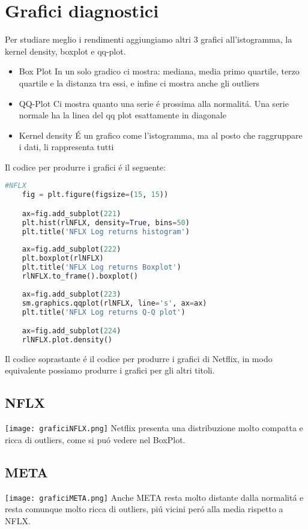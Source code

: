 \documentclass{report}
\begin{document}
\section{Grafici diagnostici}
Per studiare meglio i rendimenti aggiungiamo altri 3 grafici all'istogramma, la kernel density, boxplot e qq-plot.
\begin{itemize}[leftmargin=30pt, rightmargin=2cm]
\item Box Plot \textrightarrow{} In un solo gradico ci mostra: mediana, media primo quartile, terzo quartile e la distanza tra essi, e infine ci mostra anche gli outliers
\item QQ-Plot \textrightarrow{} Ci mostra quanto una serie é prossima alla normalitá. Una serie normale ha la linea del qq plot esattamente in diagonale
\item Kernel density \textrightarrow{} É un grafico come l'istogramma, ma al posto che raggruppare i dati, li rappresenta tutti
\end{itemize}
Il codice per produrre i grafici é il seguente:
\begin{lstlisting}[language=python]
    #NFLX
    fig = plt.figure(figsize=(15, 15))

    ax=fig.add_subplot(221)
    plt.hist(rlNFLX, density=True, bins=50)
    plt.title('NFLX Log returns histogram')
    
    ax=fig.add_subplot(222)
    plt.boxplot(rlNFLX)
    plt.title('NFLX Log returns Boxplot')
    rlNFLX.to_frame().boxplot()
    
    ax=fig.add_subplot(223)
    sm.graphics.qqplot(rlNFLX, line='s', ax=ax)
    plt.title('NFLX Log returns Q-Q plot')

    ax=fig.add_subplot(224)
    rlNFLX.plot.density()
\end{lstlisting}
Il codice soprastante é il codice per produrre i grafici di Netflix, in modo equivalente possiamo produrre i grafici per gli altri titoli.
\subsection{NFLX}
\texttt{[image: graficiNFLX.png]}
Netflix presenta una distribuzione molto compatta e ricca di outliers, come si puó vedere nel BoxPlot.
\subsection{META}
\texttt{[image: graficiMETA.png]}
Anche META resta molto distante dalla normalitá e resta comunque molto ricca di outliers, piú vicini peró alla media rispetto a NFLX.
\end{document}
